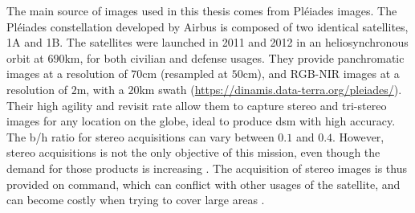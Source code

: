 The main source of images used in this thesis comes from Pléiades images. The Pléiades constellation developed by Airbus is composed of two identical satellites, 1A and 1B. The satellites were launched in 2011 and 2012 in an heliosynchronous orbit at $690$km, for both civilian and defense usages. They provide panchromatic images at a resolution of $70$cm (resampled at $50$cm), and RGB-NIR images at a resolution of $2$m, with a $20$km swath (\url{https://dinamis.data-terra.org/pleiades/}). Their high agility and revisit rate allow them to capture stereo and tri-stereo images for any location on the globe, ideal to produce \acrshort{dsm} with high accuracy. The \acrshort{b/h} ratio for stereo acquisitions can vary between $0.1$ and $0.4$. However, stereo acquisitions is not the only objective of this mission, even though the demand for those products is increasing \cite{berthier_glacier_2014, poli_radiometric_2015, rieg_pleiades_2018, loghin_potential_2020}. The acquisition of stereo images is thus provided on command, which can conflict with other usages of the satellite, and can become costly when trying to cover large areas .  
